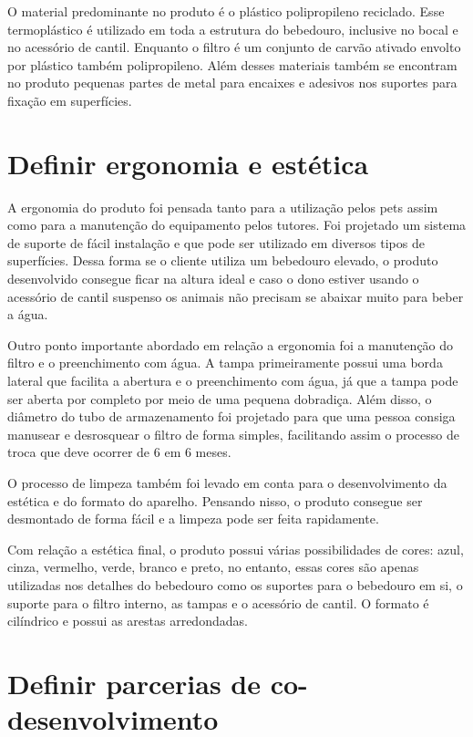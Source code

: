 \documentclass[
	12pt,				%
	openright,			%
	oneside,			%
	a4paper,			%
	english,			%
	french,				%
	spanish,			%
	brazil				%
	]{abntex2}
\begin{document}
O material predominante no produto é o plástico polipropileno reciclado. Esse termoplástico é utilizado em toda a estrutura do bebedouro, inclusive no bocal e no acessório de cantil. Enquanto o filtro é um conjunto de carvão ativado envolto por plástico também polipropileno. Além desses materiais também se encontram no produto pequenas partes de metal para encaixes e adesivos nos suportes para fixação em superfícies.


\section{Definir ergonomia e estética}

A ergonomia do produto foi pensada tanto para a utilização pelos pets assim como para a manutenção do equipamento pelos tutores. Foi projetado um sistema de suporte de fácil instalação e que pode ser utilizado em diversos tipos de superfícies. Dessa forma se o cliente utiliza um bebedouro elevado, o produto desenvolvido consegue ficar na altura ideal e caso o dono estiver usando o acessório de cantil suspenso os animais não precisam se abaixar muito para beber a água. 

Outro ponto importante abordado em relação a ergonomia foi a manutenção do filtro e o preenchimento com água. A tampa primeiramente possui uma borda lateral que facilita a abertura e o preenchimento com água, já que a tampa pode ser aberta por completo por meio de uma pequena dobradiça. Além disso, o diâmetro do tubo de armazenamento foi projetado para que uma pessoa consiga manusear e desrosquear o filtro de forma simples, facilitando assim o processo de troca que deve ocorrer de 6 em 6 meses. 

O processo de limpeza também foi levado em conta para o desenvolvimento da estética e do formato do aparelho. Pensando nisso, o produto consegue ser desmontado de forma fácil e a limpeza pode ser feita rapidamente.

Com relação a estética final, o produto possui várias possibilidades de cores: azul, cinza, vermelho, verde, branco e preto, no entanto, essas cores são apenas utilizadas nos detalhes do bebedouro como os suportes para o bebedouro em si, o suporte para o filtro interno, as tampas e o acessório de cantil. O formato é cilíndrico e possui as arestas arredondadas. 


\section{Definir parcerias de co-desenvolvimento}
\end{document}
